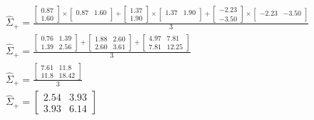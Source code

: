 \documentclass[leqno]{article}
\begin{document}
\begin{gather*}
\begin{split}
&\hat{\Sigma}_+ = 
\frac{\begin{bmatrix}
   0.87\\
   1.60 
\end{bmatrix} \times \begin{bmatrix}
   0.87 & 1.60\\
\end{bmatrix} + 
\begin{bmatrix}
   1.37\\
   1.90 
\end{bmatrix} \times \begin{bmatrix}
   1.37 & 1.90\\
\end{bmatrix} +
\begin{bmatrix}
   -2.23\\
   -3.50 
\end{bmatrix} \times \begin{bmatrix}
   -2.23 & -3.50\\
\end{bmatrix}}{3}\\ 
&\hat{\Sigma}_+ = 
\frac{\begin{bmatrix}
   0.76 & 1.39\\
   1.39 & 2.56 
\end{bmatrix} + 
\begin{bmatrix}
   1.88 & 2.60\\
   2.60 & 3.61 
\end{bmatrix} +
\begin{bmatrix}
   4.97 & 7.81\\
   7.81 & 12.25 
\end{bmatrix}
 }{3}\\
&\hat{\Sigma}_+ = 
\frac{\begin{bmatrix}
   7.61 & 11.8\\
   11.8 & 18.42 
\end{bmatrix}}{3}\\
&\hat{\Sigma}_+ = 
\begin{bmatrix}
   2.54 & 3.93\\
   3.93 & 6.14 
\end{bmatrix}\\
\end{split}
\end{gather*}
\end{document}
